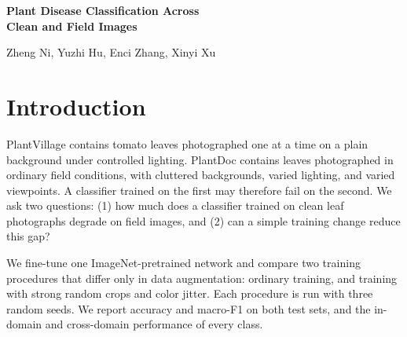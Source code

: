 \documentclass[11pt,letterpaper]{article}
\newcommand{\TeamMembers}{Zheng Ni, Yuzhi Hu, Enci Zhang, Xinyi Xu}
\begin{document}
\begin{center}
{\Large\bfseries Plant Disease Classification Across\\Clean and Field Images}\par
\vspace{.5em}\TeamMembers
\end{center}

\begin{abstract}
We measure how much a tomato-leaf disease classifier trained on clean PlantVillage photographs degrades on PlantDoc field images, and whether strong crop and color augmentation reduces this gap. We fine-tune an ImageNet-pretrained MobileNetV3-Small with ordinary training and with strong crop and color augmentation, using three paired random seeds. Ordinary training reaches $\OrdCleanAcc\pm\OrdCleanAccSD$\% accuracy on the PlantVillage test set but only $\OrdFieldAcc\pm\OrdFieldAccSD$\% on PlantDoc. Strong augmentation raises field accuracy to $\AugFieldAcc\pm\AugFieldAccSD$\% and field macro-F1 from $\OrdFieldFone$\% to $\AugFieldFone$\%, but the gain is not consistent across seeds, and the clean-to-field gap stays above 75 percentage points for accuracy. On field images both models predict late blight for most inputs.
\end{abstract}

\section{Introduction}
PlantVillage contains tomato leaves photographed one at a time on a plain background under controlled lighting. PlantDoc contains leaves photographed in ordinary field conditions, with cluttered backgrounds, varied lighting, and varied viewpoints. A classifier trained on the first may therefore fail on the second. We ask two questions: (1) how much does a classifier trained on clean leaf photographs degrade on field images, and (2) can a simple training change reduce this gap?

We fine-tune one ImageNet-pretrained network and compare two training procedures that differ only in data augmentation: ordinary training, and training with strong random crops and color jitter. Each procedure is run with three random seeds. We report accuracy and macro-F1 on both test sets, and the in-domain and cross-domain performance of every class.

\end{document}
